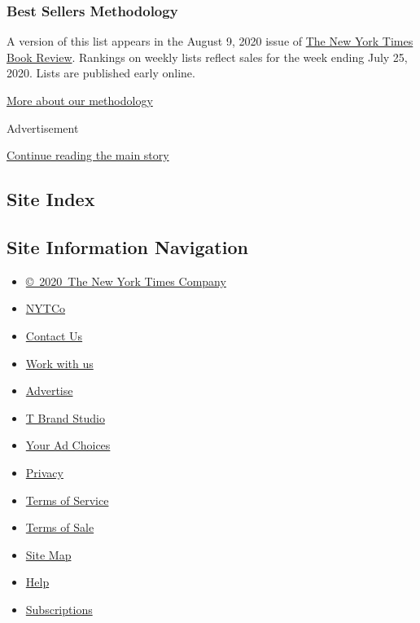 \hypertarget{best-sellers-methodology-1}{%
\subsubsection{Best Sellers
Methodology}\label{best-sellers-methodology-1}}

A version of this list appears in the August 9, 2020 issue of
\href{http://www.nytimes3xbfgragh.onion/section/books/review}{The New
York Times Book Review}. Rankings on weekly lists reflect sales for the
week ending July 25, 2020. Lists are published early online.

\href{/books/best-sellers/methodology/}{More about our methodology}

Advertisement

\protect\hyperlink{after-bottom}{Continue reading the main story}

\hypertarget{site-index}{%
\subsection{Site Index}\label{site-index}}

\hypertarget{site-information-navigation}{%
\subsection{Site Information
Navigation}\label{site-information-navigation}}

\begin{itemize}
\tightlist
\item
  \href{https://help.nytimes3xbfgragh.onion/hc/en-us/articles/115014792127-Copyright-notice}{©~2020~The
  New York Times Company}
\end{itemize}

\begin{itemize}
\tightlist
\item
  \href{https://www.nytco.com/}{NYTCo}
\item
  \href{https://help.nytimes3xbfgragh.onion/hc/en-us/articles/115015385887-Contact-Us}{Contact
  Us}
\item
  \href{https://www.nytco.com/careers/}{Work with us}
\item
  \href{https://nytmediakit.com/}{Advertise}
\item
  \href{http://www.tbrandstudio.com/}{T Brand Studio}
\item
  \href{https://www.nytimes3xbfgragh.onion/privacy/cookie-policy\#how-do-i-manage-trackers}{Your
  Ad Choices}
\item
  \href{https://www.nytimes3xbfgragh.onion/privacy}{Privacy}
\item
  \href{https://help.nytimes3xbfgragh.onion/hc/en-us/articles/115014893428-Terms-of-service}{Terms
  of Service}
\item
  \href{https://help.nytimes3xbfgragh.onion/hc/en-us/articles/115014893968-Terms-of-sale}{Terms
  of Sale}
\item
  \href{https://spiderbites.nytimes3xbfgragh.onion}{Site Map}
\item
  \href{https://help.nytimes3xbfgragh.onion/hc/en-us}{Help}
\item
  \href{https://www.nytimes3xbfgragh.onion/subscription?campaignId=37WXW}{Subscriptions}
\end{itemize}
